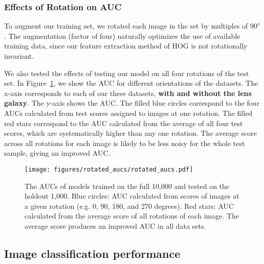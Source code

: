 \documentclass{emulateapj}
\newcommand{\todo}[1]{{\bf\color{blue} #1}}
\begin{document}
\subsubsection{Effects of Rotation on AUC}
To augment our training set, we rotated each image in the set by
multiples of $90^o$.  The augmentation (factor of four) naturally
optimizes the use of available training data, since our feature
extraction method of HOG is not rotationally invariant.  

We also tested the effects of testing our model on all four rotations
of the test set.  In Figure~\ref{fig:rotation_test}, we show the AUC
for different orientations of the datasets.  The x-axis corresponds to
each of our three datasets, \todo{with and without the lens galaxy}.
The y-axis shows the AUC.  The filled blue circles correspond to the
four AUCs calculated from test scores assigned to images at one
rotation.  The filled red stars correspond to the AUC calculated from
the average of all four test scores, which are systematically higher
than any one rotation.  The average score across all rotations for
each image is likely to be less noisy for the whole test sample,
giving an improved AUC.


\begin{figure}[t]\label{fig:rotation_test}
\begin{center}
\texttt{[image: figures/rotated\_aucs/rotated\_aucs.pdf]}
\caption{The AUCs of models trained on the full 10,000 and tested on
  the holdout 1,000.  Blue circles: AUC calculated from scores of
  images at a given rotation (e.g. 0, 90, 180, and 270 degrees).  Red
  stars: AUC calculated from the average score of all rotations of
  each image.  The average score produces an improved AUC in all data
  sets.}
\end{center}
\end{figure}



\subsection{Image classification performance}\label{sec:performance}
\end{document}
